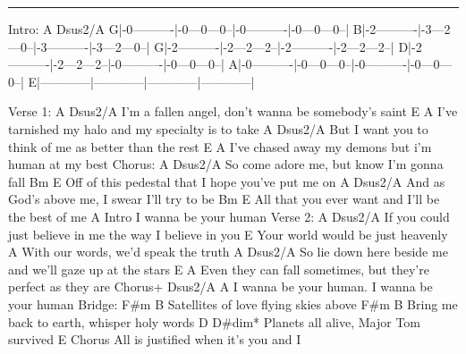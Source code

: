 \noindent\rule{\columnwidth}{1pt}

\begin{lsttab}
Intro:
   A                         Dsus2/A
G|-0----------|-0---0---0--|-0----------|-0---0---0--|
B|-2----------|-3---2---0--|-3----------|-3---2---0--|
G|-2----------|-2---2---2--|-2----------|-2---2---2--|
D|-2----------|-2---2---2--|-0----------|-0---0---0--|
A|-0----------|-0---0---0--|-0----------|-0---0---0--|
E|------------|------------|------------|------------|
\end{lsttab}
\begin{lstsong}
Verse 1:
A                         Dsus2/A
I'm a fallen angel, don't wanna be somebody's saint
     E                        A
I've tarnished my halo and my specialty is to take
      A                          Dsus2/A
But I want you to think of me as better than the rest
      E                            A
I've chased away my demons but i'm human at my best
Chorus:
   A                  Dsus2/A
So come adore me, but know I'm gonna fall
Bm                          E
Off of this pedestal that I hope you've put me on
       A                 Dsus2/A
And as God's above me, I swear I'll try to be
Bm                              E
All that you ever want and I'll be the best of me
                A      Intro
I wanna be your human
Verse 2:
   A                                    Dsus2/A
If you could just believe in me the way I believe in you
     E
Your world would be just heavenly
         A
With our words, we'd speak the truth
   A                                 Dsus2/A
So lie down here beside me and we'll gaze up at the stars
E                                         A
Even they can fall sometimes, but they're perfect as they are
Chorus+         Dsus2/A                   A
I wanna be your human.    I wanna be your human
Bridge:
F#m               B
Satellites of love flying skies above
F#m                    B
Bring me back to earth, whisper holy words
D                 D#dim*
Planets all alive, Major Tom survived
E                                        Chorus
All is justified when it's you and I
\end{lstsong}

\newpage
